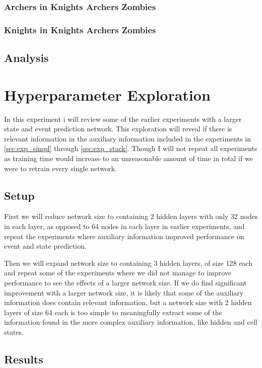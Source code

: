 \documentclass[UKenglish]{uiomasterthesis}
\begin{document}
\subsubsection{Archers in Knights Archers Zombies}
\label{sec:kaz_exp3}

\subsubsection{Knights in Knights Archers Zombies}
\subsection{Analysis}


\section{Hyperparameter Exploration}
\label{sec:exp_param}
In this experiment i will review some of the earlier experiments with a larger state and event prediction network. This exploration will reveal if there is relevant information in the auxiliary information included in the experiments in \cref{sec:exp_simpl} through \cref{sec:exp_stack}. Though I will not repeat all experiments as training time would increase to an unreasonable amount of time in total if we were to retrain every single network.

\subsection{Setup}
First we will reduce network size to containing 2 hidden layers with only 32 nodes in each layer, as opposed to 64 nodes in each layer in earlier experiments, and repeat the experiments where auxiliary information improved performance on event and state prediction.

Then we will expand network size to containing 3 hidden layers, of size 128 each and repeat some of the experiments where we did not manage to improve performance to see the effects of a larger network size. If we do find significant improvement with a larger network size, it is likely that some of the auxiliary information does contain relevant information, but a network size with 2 hidden layers of size 64 each is too simple to meaningfully extract some of the information found in the more complex auxiliary information, like hidden and cell states.

\subsection{Results}
\end{document}
